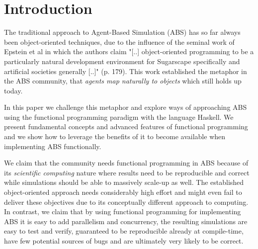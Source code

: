 \section{Introduction}


The traditional approach to Agent-Based Simulation (ABS) has so far always been object-oriented techniques, due to the influence of the seminal work of Epstein et al \cite{epstein_growing_1996} in which the authors claim "[..] object-oriented programming to be a particularly natural development environment for Sugarscape specifically and artificial societies generally [..]" (p. 179). This work established the metaphor in the ABS community, that \textit{agents map naturally to objects} \cite{north_managing_2007} which still holds up today.

In this paper we challenge this metaphor and explore ways of approaching ABS using the functional programming paradigm with the language Haskell. We present fundamental concepts and advanced features of functional programming and we show how to leverage the benefits of it \cite{hudak_history_2007} to become available when implementing ABS functionally. 

We claim that the community needs functional programming in ABS because of its \textit{scientific computing} nature where results need to be reproducible and correct while simulations should be able to massively scale-up as well. The established object-oriented approach needs considerably high effort and might even fail to deliver these objectives due to its conceptually different approach to computing. In contrast, we claim that by using functional programming for implementing ABS it is easy to add parallelism and concurrency, the resulting simulations are easy to test and verify, guaranteed to be reproducible already at compile-time, have few potential sources of bugs and are ultimately very likely to be correct.



